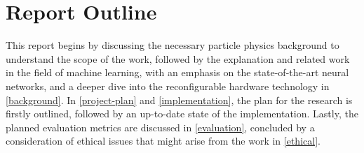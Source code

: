 \section{Report Outline}
This report begins by discussing the necessary particle physics background to understand the scope of the work, followed by the explanation and related work in the field of machine learning, with an emphasis on the state-of-the-art neural networks, and a deeper dive into the reconfigurable hardware technology in \autoref{background}. In \autoref{project-plan} and \autoref{implementation}, the plan for the research is firstly outlined, followed by an up-to-date state of the implementation. Lastly, the planned evaluation metrics are discussed in \autoref{evaluation}, concluded by a consideration of ethical issues that might arise from the work in \autoref{ethical}.

